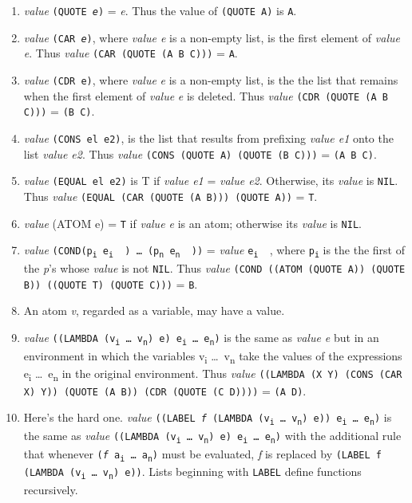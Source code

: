 \documentclass[10pt,a4paper,twocolumn]{article}
\newcommand{\args}[1] {#1\textsubscript{i} \dots \ #1\textsubscript{n}}
\newcommand{\ei}[0] {e\textsubscript{i} \ }
\newcommand{\en}[0] {e\textsubscript{n} \ }
\begin{document}
\begin{enumerate}

\item \textit{value} \texttt{(QUOTE \textit{e})} = \textit{e}. Thus the value of
  \texttt{(QUOTE A)} is \texttt{A}.

\item \textit{value} \texttt{(CAR \textit{e})}, where \textit{value e} is a
  non-empty list, is the first element of \textit{value e}. Thus \textit{value}
  \texttt{(CAR (QUOTE (A B C)))} = \texttt{A}.

\item \textit{value} \texttt{(CDR e)}, where \textit{value} \textit{e} is a
  non-empty list, is the the list that remains when the first element of
  \textit{value} \textit{e} is deleted. Thus \textit{value} \texttt{(CDR (QUOTE
    (A B C)))} = \texttt{(B C)}.

\item \textit{value} \texttt{(CONS el e2)}, is the list that results from
  prefixing \textit{value e1} onto the list \textit{value e2}. Thus
  \textit{value} \texttt{(CONS (QUOTE A) (QUOTE (B C)))} = \texttt{(A B C)}.

\item \textit{value} \texttt{(EQUAL el e2)} is T if \textit{value e1} =
  \textit{value e2}. Otherwise, its \textit{value} is \texttt{NIL}. Thus
  \textit{value} \texttt{(EQUAL (CAR (QUOTE (A B))) (QUOTE A))} = \texttt{T}.

\item \textit{value} (ATOM e) = \texttt{T} if \textit{value e} is an atom;
  otherwise its \textit{value} is \texttt{NIL}.

\item \textit{value} \texttt{(COND(p\textsubscript{i} \ei) \dots
    \texttt{} (p\textsubscript{n} \en))} = \textit{value}
  \texttt{\ei}, where \texttt{p\textsubscript{i}} is the the
  first of the \textit{p}\rq s whose \textit{value} is not \texttt{NIL}. Thus
  \textit{value} \texttt{(COND ((ATOM (QUOTE A)) (QUOTE B)) ((QUOTE T) (QUOTE
    C)))} = \texttt{B}.

\item An atom \textit{v}, regarded as a variable, may have a value.

\item \textit{value} \texttt{((LAMBDA (\args{v}) e) \args{e})} is the same as
  \textit{value e} but in an environment in which the variables \args{v} take
  the values of the expressions \args{e} in the original environment. Thus
  \textit{value} \texttt{((LAMBDA (X Y) (CONS (CAR X) Y)) (QUOTE (A B)) (CDR
    (QUOTE (C D))))} = \texttt{(A D)}.

\item Here\rq s the hard one. \textit{value} \texttt{((LABEL \textit{f} (LAMBDA
    (\args{v}) e)) \args{e})} is the same as \textit{value} \texttt{((LAMBDA
    (\args{v}) e) \args{e})} with the additional rule that whenever
  \texttt{(\textit{f} \args{a})} must be evaluated, \textit{f} is replaced by
  \texttt{(LABEL f (LAMBDA (\args{v}) e))}. Lists beginning with \texttt{LABEL}
  define functions recursively.

\end{enumerate}
\end{document}
